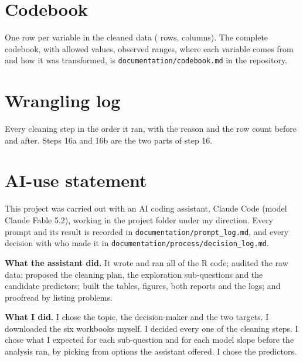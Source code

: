 \section{Codebook}

One row per variable in the cleaned data ( rows,  columns). The complete codebook, with allowed values, observed ranges, where each variable comes from and how it was transformed, is \nolinkurl{documentation/codebook.md} in the repository.

{\footnotesize

}

\section{Wrangling log}

Every cleaning step in the order it ran, with the reason and the row count before and after. Steps 16a and 16b are the two parts of step 16.

{\footnotesize

}

\section{AI-use statement}


This project was carried out with an AI coding assistant, Claude Code (model Claude Fable 5.2), working in the project folder under my direction. Every prompt and its result is recorded in \nolinkurl{documentation/prompt_log.md}, and every decision with who made it in \nolinkurl{documentation/process/decision_log.md}.

\textbf{What the assistant did.} It wrote and ran all of the R code; audited the raw data; proposed the cleaning plan, the exploration sub-questions and the candidate predictors; built the tables, figures, both reports and the logs; and proofread by listing problems.

\textbf{What I did.} I chose the topic, the decision-maker and the two targets. I downloaded the six workbooks myself. I decided every one of the  cleaning steps. I chose what I expected for each sub-question and for each model slope before the analysis ran, by picking from options the assistant offered. I chose the predictors.

